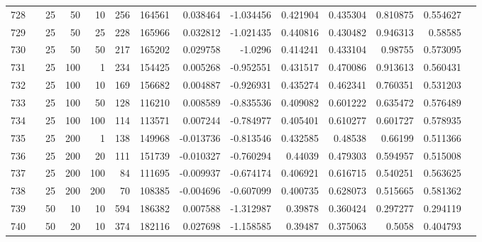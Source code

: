 \begin{longtable}{llrrrrrrrrrrrr}
		728 & &           25 &                50 &           10 &         256 &     164561 &  0.038464 & -1.034456 &  0.421904 &    0.435304 &       0.810875 &  0.554627 \\
		729 & &           25 &                50 &           25 &         228 &     165966 &  0.032812 & -1.021435 &  0.440816 &    0.430482 &       0.946313 &   0.58585 \\
		730 & &           25 &                50 &           50 &         217 &     165202 &  0.029758 &   -1.0296 &  0.414241 &    0.433104 &        0.98755 &  0.573095 \\
		731 & &           25 &               100 &            1 &         234 &     154425 &  0.005268 & -0.952551 &  0.431517 &    0.470086 &       0.913613 &  0.560431 \\
		732 & &           25 &               100 &           10 &         169 &     156682 &  0.004887 & -0.926931 &  0.435274 &    0.462341 &       0.760351 &  0.531203 \\
		733 & &           25 &               100 &           50 &         128 &     116210 &  0.008589 & -0.835536 &  0.409082 &    0.601222 &       0.635472 &  0.576489 \\
		734 & &           25 &               100 &          100 &         114 &     113571 &  0.007244 & -0.784977 &  0.405401 &    0.610277 &       0.601727 &  0.578935 \\
		735 & &           25 &               200 &            1 &         138 &     149968 & -0.013736 & -0.813546 &  0.432585 &     0.48538 &        0.66199 &  0.511366 \\
		736 & &           25 &               200 &           20 &         111 &     151739 & -0.010327 & -0.760294 &   0.44039 &    0.479303 &       0.594957 &  0.515008 \\
		737 & &           25 &               200 &          100 &          84 &     111695 & -0.009937 & -0.674174 &  0.406921 &    0.616715 &       0.540251 &  0.563625 \\
		738 & &           25 &               200 &          200 &          70 &     108385 & -0.004696 & -0.607099 &  0.400735 &    0.628073 &       0.515665 &  0.581362 \\
		739 & &           50 &                10 &           10 &         594 &     186382 &  0.007588 & -1.312987 &   0.39878 &    0.360424 &       0.297277 &  0.294119 \\
		740 & &           50 &                20 &           10 &         374 &     182116 &  0.027698 & -1.158585 &   0.39487 &    0.375063 &         0.5058 &  0.404793 \\

\end{longtable}
